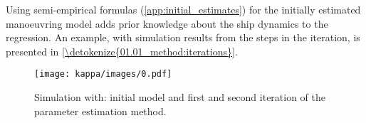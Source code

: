 \noindent Using semi-empirical formulas (\autoref{app:initial_estimates}) for the initially estimated manoeuvring model adds prior knowledge about the ship dynamics to the regression. An example, with simulation results from the steps in the iteration, is presented in \hyperref[\detokenize{01.01_method:iterations}]{\autoref{\detokenize{01.01_method:iterations}}}.


\begin{figure}[H]
    \centering
    \texttt{[image: kappa/images/0.pdf]}
    \caption{Simulation with: initial model and first and second iteration of the parameter estimation method.}
    \label{\detokenize{01.01_method:iterations}}
\end{figure}